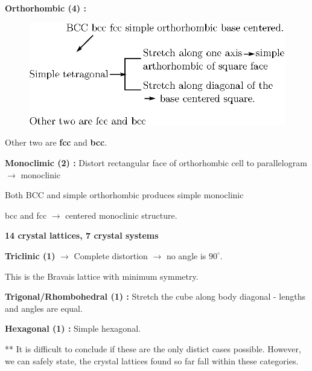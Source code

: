 \smallskip
\noindent
{\bf Orthorhombic (4) :}
\begin{figure}[H]
\centering
\includegraphics[scale=.8]{images/lecture3/fig7.eps}
\end{figure}
Other two are {\bf fcc} and {\bf bcc}.

\medskip
\noindent
{\bf Monoclimic (2) :} Distort rectangular face of orthorhombic cell to parallelogram $\to$ monoclinic

Both BCC and simple orthorhombic produces simple monoclinic

bcc and fcc $\to$ centered monoclinic structure.

\medskip
\noindent
{\bf 14 crystal lattices, 7 crystal systems}

\medskip
\noindent
{\bf Triclinic (1)} $\to$ Complete distortion $\to$ no angle is $90^{\circ}$.

This is the Bravais lattice with minimum symmetry.

\medskip
\noindent
{\bf Trigonal/Rhombohedral (1) :} Stretch the cube along body diagonal - lengths and angles are equal.

\medskip
\noindent
{\bf Hexagonal (1) :} Simple hexagonal.

** It is difficult to conclude if these are the only distict cases possible. However, we can safely state, the crystal lattices found so far fall within these categories.
